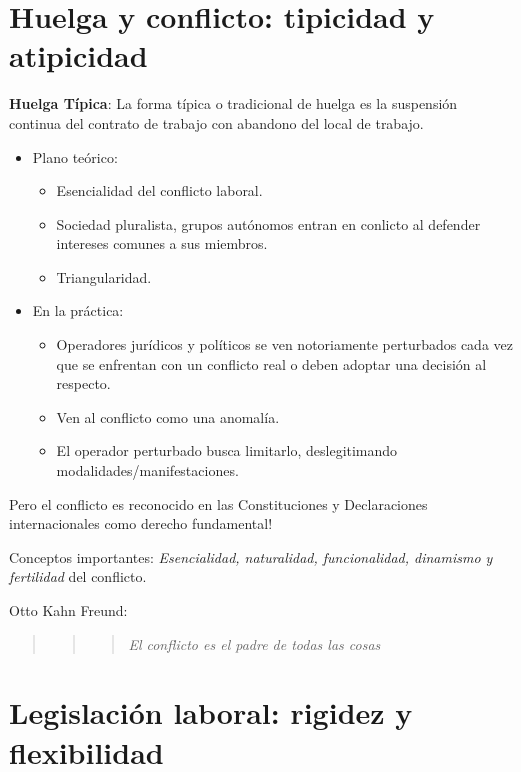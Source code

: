 \documentclass[spanish,12pt,a4paper,titlepage]{report}
\begin{document}
\section{Huelga y conflicto: tipicidad y atipicidad}
\label{sec:Huelga-y-conflicto:-tipicidad-y-atipicidad}

\textbf{Huelga Típica}: La forma típica o tradicional de huelga es la suspensión continua del contrato de trabajo con abandono del local de trabajo.

\begin{itemize}
\item Plano teórico:
  \begin{itemize}
  \item Esencialidad del conflicto laboral.
  \item Sociedad pluralista, grupos autónomos entran en conlicto al defender intereses comunes a sus miembros.
  \item Triangularidad.
  \end{itemize}
\item En la práctica:
  \begin{itemize}
  \item Operadores jurídicos y políticos se ven notoriamente perturbados cada vez que se enfrentan con un conflicto real o deben adoptar una decisión al respecto.
  \item Ven al conflicto como una anomalía.
  \item El operador perturbado busca limitarlo, deslegitimando modalidades/manifestaciones.
  \end{itemize}
\end{itemize}

Pero el conflicto es reconocido en las Constituciones y Declaraciones internacionales como derecho fundamental!

Conceptos importantes: \textit{Esencialidad, naturalidad, funcionalidad, dinamismo y fertilidad} del conflicto.

Otto Kahn Freund:
\begin{quote}\begin{quote}\begin{quote}
\textit{El conflicto es el padre de todas las cosas}
\end{quote}\end{quote}\end{quote}

\section{Legislación laboral: rigidez y flexibilidad}
\label{sec:Legislacion-laboral:-rigidez-y-flexibilidad}
\end{document}
